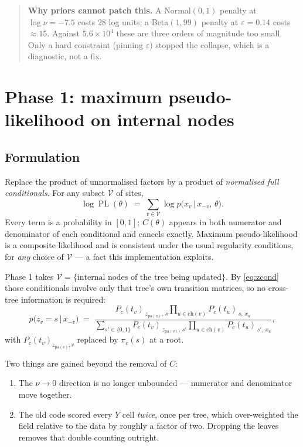 \documentclass[11pt,a4paper]{article}
\newcommand{\Ys}{Y}
\newcommand{\pa}{\mathrm{pa}}
\newcommand{\ch}{\mathrm{ch}}
\newcommand{\given}{\,\vert\,}
\DeclareMathOperator{\PL}{PL}
\begin{document}
\begin{quote}
\textbf{Why priors cannot patch this.} A Normal$(0,1)$ penalty at $\log\nu = -7.5$ costs
$28$ log units; a Beta$(1,99)$ penalty at $\varepsilon = 0.14$ costs $\approx 15$. Against
$5.6\times10^{4}$ these are three orders of magnitude too small. Only a hard constraint
(pinning $\varepsilon$) stopped the collapse, which is a diagnostic, not a fix.
\end{quote}

\section{Phase 1: maximum pseudo-likelihood on internal nodes}
\label{sec:phase1}

\subsection{Formulation}

Replace the product of unnormalised factors by a product of \emph{normalised full
conditionals}. For any subset $\mathcal{V}$ of sites,
\begin{equation}
  \log \PL(\theta) \;=\; \sum_{v \in \mathcal{V}} \log p\bigl(x_v \given x_{-v},\, \theta\bigr).
  \label{eq:pl}
\end{equation}
Every term is a probability in $[0,1]$; $C(\theta)$ appears in both numerator and
denominator of each conditional and cancels exactly. Maximum pseudo-likelihood is a
composite likelihood and is consistent under the usual regularity conditions, for
\emph{any} choice of $\mathcal{V}$ --- a fact this implementation exploits.

Phase 1 takes $\mathcal{V} = \{\text{internal nodes of the tree being updated}\}$. By
\eqref{eq:zcond} those conditionals involve only that tree's own transition matrices, so no
cross-tree information is required:
\begin{equation}
  p\bigl(z_v = s \given x_{-v}\bigr)
  \;=\;
  \frac{
    P_c(t_v)_{\,z_{\pa(v)},\,s} \displaystyle\prod_{u \in \ch(v)} P_c(t_u)_{\,s,\,x_u}
  }{
    \displaystyle\sum_{s' \in \{0,1\}}
    P_c(t_v)_{\,z_{\pa(v)},\,s'} \prod_{u \in \ch(v)} P_c(t_u)_{\,s',\,x_u}
  },
  \label{eq:plterm}
\end{equation}
with $P_c(t_v)_{z_{\pa(v)},s}$ replaced by $\pi_c(s)$ at a root.

Two things are gained beyond the removal of $C$:
\begin{enumerate}[label=(\roman*)]
  \item The $\nu \to 0$ direction is no longer unbounded --- numerator and denominator move
        together.
  \item The old code scored every $\Ys$ cell \emph{twice}, once per tree, which
        over-weighted the field relative to the data by roughly a factor of two. Dropping
        the leaves removes that double counting outright.
\end{enumerate}
\end{document}
